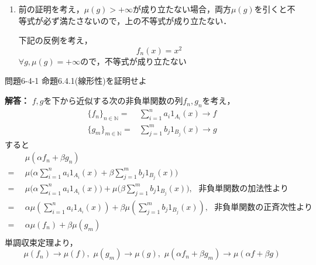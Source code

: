 \documentclass{jsarticle}
\begin{document}
\begin{enumerate}
\item 前の証明を考え，$\mu(g)>+\infty$が成り立たない場合，両方$\mu(g)$を引くと不等式が必ず満たさないので，上の不等式が成り立たない．

下記の反例を考え，
\[
f_n(x) = x^2
\]
$\forall g, \mu(g) = + \infty$ので，不等式が成り立たない

\end{enumerate}

\begin{itembox}[l]{問題6-4-1}
命題6.4.1(線形性)を証明せよ
\end{itembox}
{\bf 解答：}
$f,g$を下から近似する次の非負単関数の列$f_n,g_n$を考え，
\begin{equation*}
\begin{split}
\{f_n\}_{n \in \mathbb{N}}  = & \sum_{i=1}^n a_i 1_{A_i}(x) \to f \\
\{g_m\}_{m \in \mathbb{N}} = & \sum_{j=1}^m b_j 1_{B_j}(x) \to g
\end{split}
\end{equation*}
すると
\begin{equation*}
\begin{split}
&\,\,\, \mu(\alpha f_n + \beta g_n) \\
=&\,\,\, \mu \Bigr( \alpha \sum_{i=1}^n a_i 1_{A_i}(x)+ \beta \sum_{j=1}^m b_j 1_{B_j}(x) \Bigr)\\
=&\,\,\, \mu \Bigr( \alpha\sum_{i=1}^n a_i 1_{A_i}(x) \Bigr) + \mu \Bigr( \beta  \sum_{j=1}^m b_j 1_{B_j}(x)\Bigr),\,\,\,\,\text{非負単関数の加法性より}\\
=&\,\,\, \alpha \mu( \sum_{i=1}^n a_i 1_{A_i}(x)) +  \beta \mu(\sum_{j=1}^m b_j 1_{B_j}(x)),\,\,\,\,\text{非負単関数の正斉次性より}\\
=&\,\,\, \alpha \mu(f_n) + \beta \mu(g_m) \\
\end{split}
\end{equation*}
単調収束定理より，
\begin{equation*}
\mu(f_n) \to \mu(f),\,\, \mu(g_m) \to \mu(g),\,\,\mu(\alpha f_n + \beta g_m) \to \mu(\alpha f + \beta g)
\end{equation*}
\end{document}
